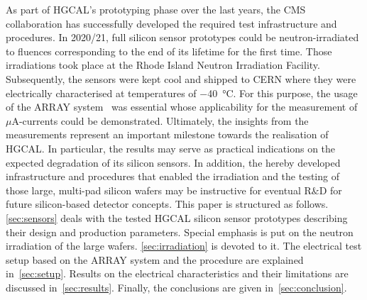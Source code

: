 As part of HGCAL's prototyping phase over the last years, the CMS collaboration has successfully developed the required test infrastructure and procedures.
In 2020/21, full silicon sensor prototypes could be neutron-irradiated to fluences corresponding to the end of its lifetime for the first time. 
Those irradiations took place at the Rhode Island Neutron Irradiation Facility. 
Subsequently, the sensors were kept cool and shipped to CERN where they were electrically characterised at temperatures of \SI{-40}{\celsius}.
For this purpose, the usage of the ARRAY system~\cite{pitters:array2019} was essential whose applicability for the measurement of $\mu$A-currents could be demonstrated.
Ultimately, the insights from the measurements represent an important milestone towards the realisation of HGCAL.
In particular, the results may serve as practical indications on the expected degradation of its silicon sensors. 
In addition, the hereby developed infrastructure and procedures that enabled the irradiation and the testing of those large, multi-pad silicon wafers may be instructive for eventual R$\&$D for future silicon-based detector concepts.\newline
This paper is structured as follows.
\ref{sec:sensors} deals with the tested HGCAL silicon sensor prototypes describing their design and production parameters.
Special emphasis is put on the neutron irradiation of the large wafers. 
\ref{sec:irradiation} is devoted to it.
The electrical test setup based on the ARRAY system and the procedure are explained in~\ref{sec:setup}.
Results on the electrical characteristics and their limitations are discussed in~\ref{sec:results}.
Finally, the conclusions are given in~\ref{sec:conclusion}.